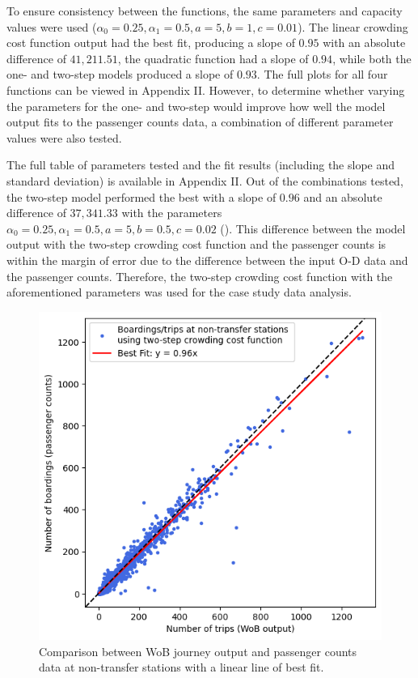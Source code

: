 To ensure consistency between the functions, the same parameters and capacity values were used ($\alpha_0=0.25, \alpha_1=0.5, a=5, b=1, c=0.01$). The linear crowding cost function output had the best fit, producing a slope of $0.95$ with an absolute difference of $41,211.51$, the quadratic function had a slope of $0.94$, while both the one- and two-step models produced a slope of $0.93$. The full plots for all four functions can be viewed in Appendix II. However, to determine whether varying the parameters for the one- and two-step would improve how well the model output fits to the passenger counts data, a combination of different parameter values were also tested. 

The full table of parameters tested and the fit results (including the slope and standard deviation) is available in Appendix II. Out of the combinations tested, the two-step model performed the best with a slope of $0.96$ and an absolute difference of $37,341.33$ with the parameters $\alpha_0=0.25, \alpha_1=0.5, a=5, b=0.5, c=0.02$ (). This difference between the model output with the two-step crowding cost function and the passenger counts is within the margin of error due to the difference between the input O-D data and the passenger counts. Therefore, the two-step crowding cost function with the aforementioned parameters was used for the case study data analysis. 

\begin{figure}
    \centering
    \includegraphics[width=0.5\linewidth]{images/Validation/two_step_final.png}
    \caption[Comparison between WoB journey output and passenger counts data at non-transfer stations]{Comparison between WoB journey output and passenger counts data at non-transfer stations with a linear line of best fit.}
    \label{fig:two_step_final}
\end{figure}

